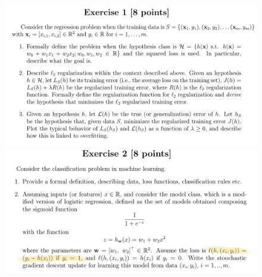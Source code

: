 \documentclass[a4paper,11pt,oneside]{book}
\begin{document}
\begin{figure}[H]
    \centering
    \begin{minipage}{0.45\textwidth}
        \includegraphics[width=\textwidth,page=3]{images/ex1_7_Feb_2020.png}
    \end{minipage}
    \hfill
    \begin{minipage}{0.45\textwidth}
        \includegraphics[width=\textwidth,page=6]{images/ex2_7_Feb_2020.png}
    \end{minipage}
    
    \vspace{1cm}
    

\end{figure}
\end{document}
